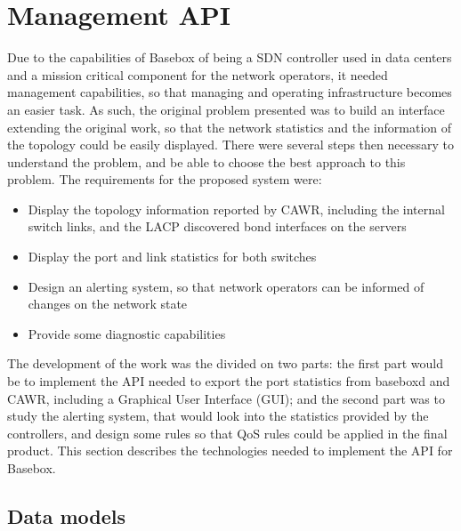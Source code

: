 \chapter {Management API}

Due to the capabilities of Basebox of being a SDN controller used in data centers and a mission critical component for the network operators, it needed management capabilities, so that managing and operating infrastructure becomes 
an easier task. As such, the original problem presented was to build an interface extending the original work, so that the network statistics and the information of the topology could be easily displayed. There were several steps
then necessary to understand the problem, and be able to choose the best approach to this problem. The requirements for the proposed system were:

\begin {itemize}
    \item Display the topology information reported by CAWR, including the internal switch links, and the LACP discovered bond interfaces on the servers
    \item Display the port and link statistics for both switches
    \item Design an alerting system, so that network operators can be informed of changes on the network state
    \item Provide some diagnostic capabilities
\end {itemize}

\par The development of the work was the divided on two parts: the first part would be to implement the API needed to export the port statistics from baseboxd and CAWR, including a Graphical User Interface (GUI); and the second 
part was to study the alerting system, that would look into the statistics provided by the controllers, and design some rules so that QoS rules could be applied in the final product. This section describes the technologies needed 
to implement the API for Basebox.

\section {Data models}


